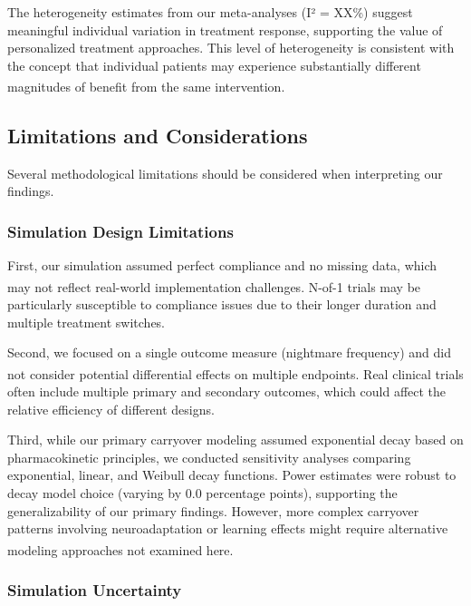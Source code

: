 \documentclass[
  11pt,
]{article}
\begin{document}
The heterogeneity estimates from our meta-analyses (I² = XX\%) suggest
meaningful individual variation in treatment response, supporting the
value of personalized treatment approaches. This level of heterogeneity
is consistent with the concept that individual patients may experience
substantially different magnitudes of benefit from the same
intervention\textsuperscript{}.

\subsection{Limitations and
Considerations}\label{limitations-and-considerations}

Several methodological limitations should be considered when
interpreting our findings.

\subsubsection{Simulation Design
Limitations}\label{simulation-design-limitations}

First, our simulation assumed perfect compliance and no missing data,
which may not reflect real-world implementation
challenges\textsuperscript{}.
N-of-1 trials may be particularly susceptible to compliance issues due
to their longer duration and multiple treatment switches.

Second, we focused on a single outcome measure (nightmare frequency) and
did not consider potential differential effects on multiple
endpoints\textsuperscript{}.
Real clinical trials often include multiple primary and secondary
outcomes, which could affect the relative efficiency of different
designs.

Third, while our primary carryover modeling assumed exponential decay
based on pharmacokinetic principles, we conducted sensitivity analyses
comparing exponential, linear, and Weibull decay functions. Power
estimates were robust to decay model choice (varying by 0.0 percentage
points), supporting the generalizability of our primary findings.
However, more complex carryover patterns involving neuroadaptation or
learning effects might require alternative modeling approaches not
examined
here\textsuperscript{}.

\subsubsection{Simulation Uncertainty}\label{simulation-uncertainty}
\end{document}
